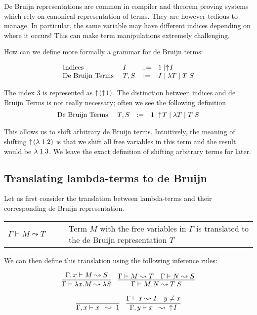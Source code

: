 De Bruijn representations are common in compiler and theorem proving
systems which rely on canonical representation of terms. They are
however tedious to manage. In particular, the same variable may have
different indices depending on where it occurs! This can make term
manipulations extremely challenging.

How can we define more formally a grammar for de Bruijn terms:

\[
\begin{array}{llcl}
\mbox{Indices}            & I    & ::= & 1 \mid \uparrow\! I \\
\mbox{De Bruijn Terms   } & T, S & := & I \mid \lambda T \mid  T\;S
\end{array}
\]

The index $3$ is represented as $\uparrow\! (\uparrow\! 1)$. The distinction
between indices and de Bruijn Terms is not really necessary; often we
see the following definition
\[
\begin{array}{llcl}
\mbox{De Bruijn Terms   } & T, S & := & 1 \mid \uparrow\! T \mid \lambda T \mid  T\;S
\end{array}
\]

This allows us to shift arbitrary de Bruijn terms. Intuitively, the
meaning of shifting $\uparrow\! (\lambda \;1\;2)$ is that we shift all free
variables in this term and the result would be $\lambda \;1\;3$. We leave
the exact definition of shifting arbitrary terms for later.


\subsection*{Translating lambda-terms to de Bruijn}

Let us first consider the translation between lambda-terms and their
corresponding de Bruijn representation.

\begin{center}
\begin{tabular}{lp{9cm}}
$  \Gamma \vdash M \leadsto T\quad\quad$ & Term $M$ with the free variables
    in $\Gamma$ is translated to the de Bruijn representation $T$
\end{tabular}
\end{center}

We can then define this translation using the following inference rules:

\[
\begin{array}{c}
\infer{\Gamma \vdash \lambda x. M \leadsto \lambda S}{\Gamma,x \vdash M
\leadsto S} \quad
\infer{\Gamma \vdash M\;N \leadsto T\;S}{
\Gamma \vdash M \leadsto T
  &
\Gamma \vdash N \leadsto S}
\\[1em]
\infer{\Gamma,x \vdash x \;\;\leadsto \;1}{} \quad
\infer{\Gamma, y \vdash x\;\; \leadsto\;\; \shift I}{\Gamma \vdash x \leadsto
  I \quad y \neq x}
\end{array}
\]

